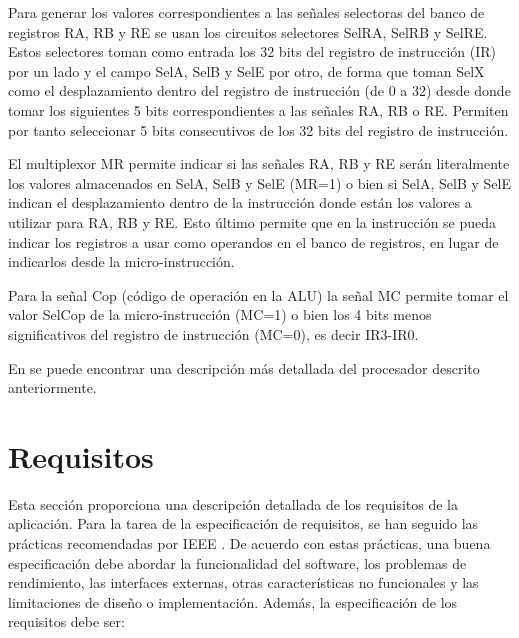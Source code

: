 Para generar los valores correspondientes a las señales selectoras del banco de registros RA, RB y RE se usan los circuitos selectores SelRA, SelRB y SelRE. Estos selectores toman como entrada los 32 bits del registro de instrucción (IR) por un lado y el campo SelA, SelB y SelE por otro, de forma que toman SelX como el desplazamiento dentro del registro de instrucción (de 0 a 32) desde donde tomar los siguientes 5 bits correspondientes a las señales RA, RB o RE. Permiten por tanto seleccionar 5 bits consecutivos de los 32 bits del registro de instrucción.

El multiplexor MR permite indicar si las señales RA, RB y RE serán literalmente los valores almacenados en SelA, SelB y SelE (MR=1) o bien si SelA, SelB y SelE indican el desplazamiento dentro de la instrucción donde están los valores a utilizar para RA, RB y RE. Esto último permite que en la instrucción se pueda indicar los registros a usar como operandos en el banco de registros, en lugar de indicarlos desde la micro-instrucción.

Para la señal Cop (código de operación en la ALU) la señal MC permite tomar el valor SelCop de la micro-instrucción (MC=1) o bien los 4 bits menos significativos del registro de instrucción (MC=0), es decir IR3-IR0.

En \cite{perez2015problemas} se puede encontrar una descripción más detallada del procesador descrito anteriormente.

\section{Requisitos}
\label{sec:requirements}

Esta sección proporciona una descripción detallada de los requisitos de la aplicación. Para la tarea de la especificación de requisitos, se han seguido las prácticas recomendadas por IEEE \cite{ieee1998}. De acuerdo con estas prácticas, una buena especificación debe abordar la funcionalidad del software, los problemas de rendimiento, las interfaces externas, otras características no funcionales y las limitaciones de diseño o implementación.
Además, la especificación de los requisitos debe ser:

